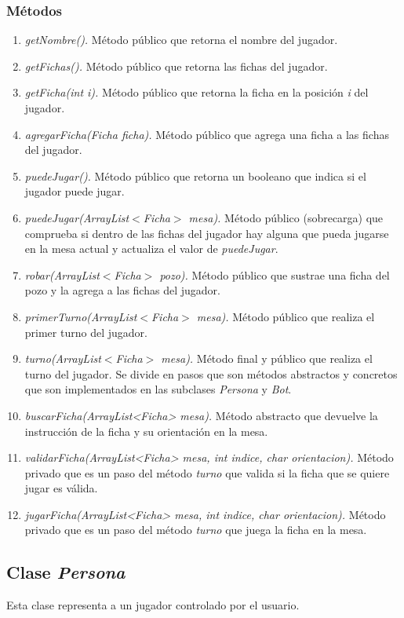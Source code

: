 \documentclass[12pt]{article}
\begin{document}
  \subsubsection{Métodos}
  \begin{enumerate}
    \item \textit{getNombre().} Método público que retorna el nombre del jugador.
    \item \textit{getFichas().} Método público que retorna las fichas del jugador.
    \item \textit{getFicha(int i).} Método público que retorna la ficha en la posición \textit{i} del jugador.

    \item \textit{agregarFicha(Ficha ficha).} Método público que agrega una ficha a las fichas del jugador.
    \item \textit{puedeJugar().} Método público que retorna un booleano que indica si el jugador puede jugar.
    \item \textit{puedeJugar(ArrayList$<$Ficha$>$ mesa).} Método público (sobrecarga) que comprueba si dentro de las fichas del jugador hay alguna que pueda jugarse en la mesa actual y actualiza el valor de \textit{puedeJugar}.
    \item \textit{robar(ArrayList$<$Ficha$>$ pozo).} Método público que sustrae una ficha del pozo y la agrega a las fichas del jugador.
    \item \textit{primerTurno(ArrayList$<$Ficha$>$ mesa).} Método público que realiza el primer turno del jugador.
    \item \textit{turno(ArrayList$<$Ficha$>$ mesa).} Método final y público que realiza el turno del jugador. Se divide en pasos que son métodos abstractos y concretos que son implementados en las subclases \textit{Persona} y \textit{Bot}.
    \item \textit{buscarFicha(ArrayList<Ficha> mesa).} Método abstracto que devuelve la instrucción de la ficha y su orientación en la mesa.
    \item \textit{validarFicha(ArrayList<Ficha> mesa, int indice, char orientacion).} Método privado que es un paso del método \textit{turno} que valida si la ficha que se quiere jugar es válida.
    \item \textit{jugarFicha(ArrayList<Ficha> mesa, int indice, char orientacion).} Método privado que es un paso del método \textit{turno} que juega la ficha en la mesa.  
  \end{enumerate}

  \subsection{Clase \textit{Persona}}
  Esta clase representa a un jugador controlado por el usuario.
\end{document}
